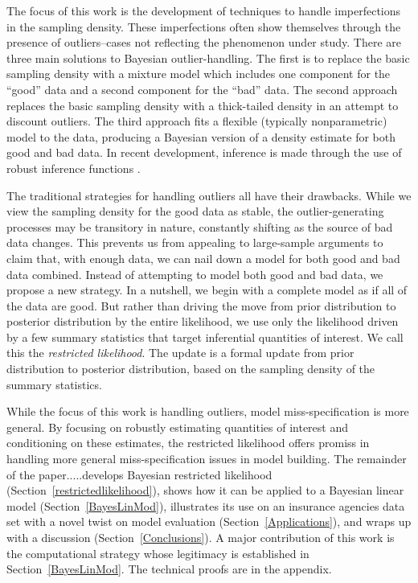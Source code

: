 \documentclass[11pt]{article}
\begin{document}
The focus of this work is the development of techniques to handle imperfections in the sampling density.  These imperfections often show
themselves through the presence of outliers--cases not reflecting the phenomenon under
study. There are three main solutions to Bayesian outlier-handling.  The first is to replace the basic sampling
density with a mixture model which includes one component for the ``good'' data and a second 
component for the ``bad'' data.  The second approach replaces the
basic sampling density with a thick-tailed density in an attempt to discount outliers.  The third approach fits a flexible (typically nonparametric) model to the data, producing a Bayesian version of a density estimate for both good and bad data.  In recent 
development, inference is made through the use of robust inference functions \citep[][in press]{lee2013}.  

The traditional strategies for handling outliers all have their drawbacks.  While we view the sampling 
density for the good data as stable, the outlier-generating processes 
may be transitory in nature, constantly shifting as the source of bad data changes.  This prevents
us from appealing to large-sample arguments to claim that, with enough data, we can nail down a
model for both good and bad data combined.  Instead of attempting to model both good and bad
data, we propose a new strategy. In a nutshell, we begin with a complete model   
as if all of the data are good. But rather than driving the move from prior distribution to posterior
distribution by the entire likelihood, we use only the likelihood driven by a
few summary statistics that target inferential quantities
of interest.  We call this the \textit{restricted likelihood}. The update is a formal update from prior distribution to posterior distribution, based on the sampling density of the summary statistics. 

While the focus of this work is handling outliers, model miss-specification is more general. By focusing on robustly estimating quantities of interest and conditioning on these estimates, the restricted likelihood offers promiss in handling more general miss-specification issues in model building. The remainder of the paper.....develops Bayesian restricted likelihood (Section~\ref{restrictedlikelihood}), shows
how it can be applied to a Bayesian linear model (Section~\ref{BayesLinMod}), illustrates its use
on an insurance agencies data set with a novel twist on model evaluation (Section~\ref{Applications}), 
and wraps up with a discussion (Section~\ref{Conclusions}).  
A major contribution of this work is the computational strategy whose legitimacy is established 
in Section~\ref{BayesLinMod}.  The technical proofs are in the appendix.   
\end{document}
